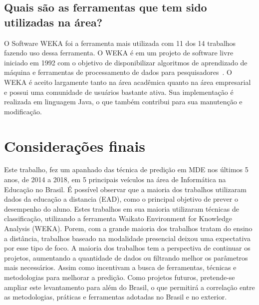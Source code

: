 \documentclass[ti]{texufpel} %
\begin{document}
\section{Quais são as ferramentas que tem sido utilizadas na área?}

O Software WEKA foi a ferramenta mais utilizada com 11 dos 14 trabalhos fazendo uso dessa ferramenta. O WEKA é em um projeto de software livre iniciado em 1992 com o objetivo de disponibilizar algoritmos de aprendizado de máquina e ferramentas de processamento de dados para pesquisadores~\cite{hall2009weka}. O WEKA é aceito largamente tanto na área acadêmica quanto na área empresarial e possui uma comunidade de usuários bastante ativa. Sua implementação é realizada em linguagem Java, o que também contribui para sua manutenção e modificação.


\chapter{Considerações finais}

Este trabalho, fez um apanhado das técnica de predição em MDE nos últimos 5 anos, de 2014 a 2018, em 5 principais veículos na área de Informática na Educação no Brasil. É possível observar que a maioria dos trabalhos utilizaram dados da educação a distancia (EAD), como o principal objetivo de prever o desempenho do aluno. Estes trabalhos em sua maioria utilizaram técnicas de classificação, utilizando a ferramenta Waikato Environment for Knowledge Analysis (WEKA). Porem, com a grande maioria dos trabalhos tratam do ensino a distância, trabalhos baseado na modalidade presencial deixou uma expectativa por esse tipo de foco.
A maioria dos trabalhos tem a perspectiva de continuar os projetos, aumentando a quantidade de dados ou filtrando melhor os parâmetros mais necessários. Assim como incentivam a busca de ferramentas, técnicas e metodologias para melhorar a predição.
Como projetos futuros, pretende-se ampliar este levantamento para além do Brasil, o que permitirá a correlação entre as metodologias, práticas e ferramentas adotadas no Brasil e no exterior.



\end{document}
